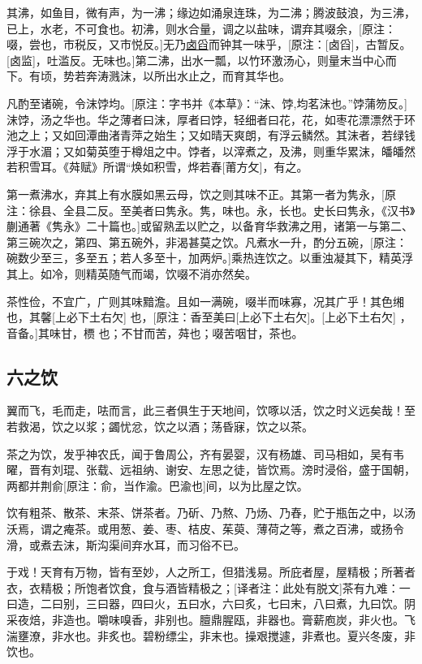 \documentclass[]{article}
\begin{document}
其沸，如鱼目，微有声，为一沸；缘边如涌泉连珠，为二沸；腾波鼓浪，为三沸，已上，水老，不可食也。初沸，则水合量，调之以盐味，谓弃其啜余，{[}原注：啜，尝也，市税反，又市悦反。{]}无乃\href{}{卤舀}而钟其一味乎，{[}原注：{[}卤舀{]}，古暂反。{[}卤监{]}，吐滥反。无味也。{]}第二沸，出水一瓢，以竹环激汤心，则量末当中心而下。有顷，势若奔涛溅沫，以所出水止之，而育其华也。

凡酌至诸碗，令沫饽均。{[}原注：字书并《本草》：``沫、饽,均茗沫也。''饽蒲笏反。{]}沫饽，汤之华也。华之薄者曰沫，厚者曰饽，轻细者曰花，花，如枣花漂漂然于环池之上；又如回潭曲渚青萍之始生；又如晴天爽朗，有浮云鳞然。其沫者，若绿钱浮于水湄；又如菊英堕于樽俎之中。饽者，以滓煮之，及沸，则重华累沫，皤皤然若积雪耳。《荈赋》所谓``焕如积雪，烨若春{[}莆方攵{]}，有之。

第一煮沸水，弃其上有水膜如黑云母，饮之则其味不正。其第一者为隽永，{[}原注：徐县、全县二反。至美者曰隽永。隽，味也。永，长也。史长曰隽永，《汉书》蒯通著《隽永》二十篇也。{]}或留熟盂以贮之，以备育华救沸之用，诸第一与第二、第三碗次之，第四、第五碗外，非渴甚莫之饮。凡煮水一升，酌分五碗，{[}原注：碗数少至三，多至五；若人多至十，加两炉。{]}乘热连饮之。以重浊凝其下，精英浮其上。如冷，则精英随气而竭，饮啜不消亦然矣。

茶性俭，不宜广，广则其味黯澹。且如一满碗，啜半而味寡，况其广乎！其色缃也，其馨{[}上必下土右欠{]}
也，{[}原注：香至美曰{[}上必下土右欠{]}。{[}上必下土右欠{]}
，音备。{]}其味甘，槚 也；不甘而苦，荈也；啜苦咽甘，茶也。

\hypertarget{header-n27}{%
\subsection{六之饮}\label{header-n27}}

翼而飞，毛而走，呿而言，此三者俱生于天地间，饮啄以活，饮之时义远矣哉！至若救渴，饮之以浆；蠲忧忿，饮之以酒；荡昏寐，饮之以茶。

茶之为饮，发乎神农氏，闻于鲁周公，齐有晏婴，汉有杨雄、司马相如，吴有韦曜，晋有刘琨、张载、远祖纳、谢安、左思之徒，皆饮焉。滂时浸俗，盛于国朝，两都并荆俞{[}原注：俞，当作渝。巴渝也{]}间，以为比屋之饮。

饮有粗茶、散茶、末茶、饼茶者。乃斫、乃熬、乃炀、乃舂，贮于瓶缶之中，以汤沃焉，谓之痷茶。或用葱、姜、枣、桔皮、茱萸、薄荷之等，煮之百沸，或扬令滑，或煮去沫，斯沟渠间弃水耳，而习俗不已。

于戏！天育有万物，皆有至妙，人之所工，但猎浅易。所庇者屋，屋精极；所著者衣，衣精极；所饱者饮食，食与酒皆精极之；{[}译者注：此处有脱文{]}茶有九难：一曰造，二曰别，三曰器，四曰火，五曰水，六曰炙，七曰末，八曰煮，九曰饮。阴采夜焙，非造也。嚼味嗅香，非别也。膻鼎腥瓯，非器也。膏薪庖炭，非火也。飞湍壅潦，非水也。非炙也。碧粉缥尘，非末也。操艰搅遽，非煮也。夏兴冬废，非饮也。
\end{document}
